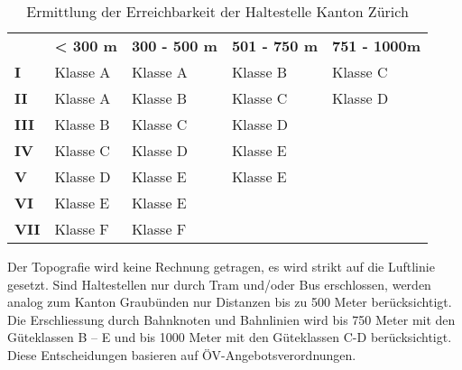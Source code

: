 \begin{table}[ht]
    \begin{tabular}[c]{l p{3.3cm} p{3.3cm} p{3.3cm} p{3.3cm}}
        \midrule
        \textbf{}
                                & \textbf{< 300 m}
                                & \textbf{300 - 500 m}
                                & \textbf{501 - 750 m}
                                & \textbf{751 - 1000m}\\
        \textbf{I}
                                & Klasse A
                                & Klasse A
                                & Klasse B
                                & Klasse C\\
        \textbf{II}
                                & Klasse A
                                & Klasse B
                                & Klasse C
                                & Klasse D\\
        \textbf{III}
                                & Klasse B
                                & Klasse C
                                & Klasse D
                                &\\
        \textbf{IV}
                                & Klasse C
                                & Klasse D
                                & \cellcolor{red!25}Klasse E
                                &\\
        \textbf{V}
                                & Klasse D
                                & \cellcolor{red!25}Klasse E
                                & \cellcolor{red!25}Klasse E
                                &\\
        \cellcolor{red!25}\textbf{VI}
                                & \cellcolor{red!25}Klasse E
                                & \cellcolor{red!25}Klasse E
                                &
                                &\\
        \cellcolor{red!25}\textbf{VII}
                                & \cellcolor{red!25}Klasse F
                                & \cellcolor{red!25}Klasse F
                                &
                                &\\                                
        \bottomrule
    \end{tabular}
    \caption{Ermittlung der Erreichbarkeit der Haltestelle Kanton Zürich}
    \label{table:Ermittlung Erreichbarkeit der Haltestelle Kanton Zürich}
\end{table}

Der Topografie wird keine Rechnung getragen, es wird strikt auf die Luftlinie gesetzt.
Sind Haltestellen nur durch Tram und/oder Bus erschlossen, werden analog zum Kanton Graubünden nur Distanzen bis zu 500 Meter berücksichtigt.
Die Erschliessung durch Bahnknoten und Bahnlinien wird bis 750 Meter mit den Güteklassen B – E und bis 1000 Meter mit den Güteklassen C-D berücksichtigt.
Diese Entscheidungen basieren auf ÖV-Angebotsverordnungen.

